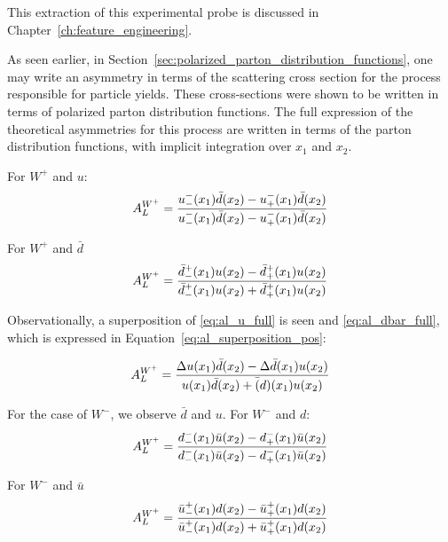 This extraction of this experimental probe is discussed in
Chapter~\ref{ch:feature_engineering}.

As seen earlier, in Section~\ref{sec:polarized_parton_distribution_functions},
one may write an asymmetry in terms of the scattering cross section for the
process responsible for particle yields. These cross-sections were shown to be
written in terms of polarized parton distribution functions. The full expression
of the theoretical asymmetries for this process are written in terms of the
parton distribution functions, with implicit integration over $x_1$ and $x_2$.

For $W^+$ and $u$:
\begin{equation}
  {A_L^{W^+}} = 
  {
    {u_-^-(x_1)\bar{d}(x_2)-u_+^-(x_1)\bar{d}(x_2)}
    \over
    {u_-^-(x_1)\bar{d}(x_2)-u_+^-(x_1)\bar{d}(x_2)}
  }  
  \label{eq:al_u_full}
\end{equation}

For $W^+$ and $\bar{d}$
\begin{equation}
  {A_L^{W^+}} = 
  {
    {\bar{d}_-^+(x_1)u(x_2)-\bar{d}_+^+(x_1)u(x_2)}
    \over
    {\bar{d}_-^+(x_1)u(x_2)+\bar{d}_+^+(x_1)u(x_2)}
  }  
  \label{eq:al_dbar_full}
\end{equation}

{\noindent}Observationally, a superposition of \ref{eq:al_u_full} is seen and
\ref{eq:al_dbar_full}, which is expressed in
Equation~\ref{eq:al_superposition_pos}:

\begin{equation}
  {A_L^{W^+}} = 
  {
    {
      \Delta u(x_1)\bar{d}(x_2)-\Delta \bar{d}(x_1)u(x_2)
    }
    \over
    {
      u(x_1)\bar d(x_2)+\bar(d)(x_1)u(x_2)
    }
  }
  \label{eq:al_superposition_pos}
\end{equation}

{\noindent}For the case of $W^-$, we observe $\bar{d}$ and $u$. For $W^-$ and $d$:
\begin{equation}
  {A_L^{W^+}} = 
  {
    {d_-^-(x_1)\bar{u}(x_2)-d_+^-(x_1)\bar{u}(x_2)}
    \over
    {d_-^-(x_1)\bar{u}(x_2)-d_+^-(x_1)\bar{u}(x_2)}
  }  
  \label{eq:al_d_full}
\end{equation}

{\noindent}For $W^-$ and $\bar{u}$
\begin{equation}
  {A_L^{W^+}} = 
  {
    {\bar{u}_-^+(x_1)d(x_2)-\bar{u}_+^+(x_1)d(x_2)}
    \over
    {\bar{u}_-^+(x_1)d(x_2)+\bar{u}_+^+(x_1)d(x_2)}
  }  
  \label{eq:al_ubar_full}
\end{equation}


